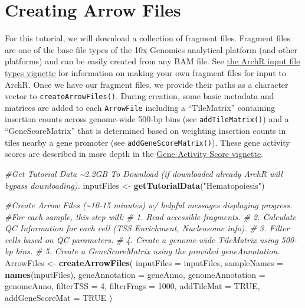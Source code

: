 \documentclass[
  12pt,
]{krantz}
\newenvironment{Shaded}{\begin{snugshade}}{\end{snugshade}}
\newcommand{\CommentTok}[1]{\textcolor[rgb]{0.56,0.35,0.01}{\textit{#1}}}
\newcommand{\DataTypeTok}[1]{\textcolor[rgb]{0.13,0.29,0.53}{#1}}
\newcommand{\DecValTok}[1]{\textcolor[rgb]{0.00,0.00,0.81}{#1}}
\newcommand{\KeywordTok}[1]{\textcolor[rgb]{0.13,0.29,0.53}{\textbf{#1}}}
\newcommand{\NormalTok}[1]{#1}
\newcommand{\OtherTok}[1]{\textcolor[rgb]{0.56,0.35,0.01}{#1}}
\newcommand{\StringTok}[1]{\textcolor[rgb]{0.31,0.60,0.02}{#1}}
\begin{document}
\hypertarget{creating-arrow-files}{%
\chapter{Creating Arrow Files}\label{creating-arrow-files}}

For this tutorial, we will download a collection of fragment files. Fragment files are one of the base file types of the 10x Genomics analytical platform (and other platforms) and can be easily created from any BAM file. See \href{articles/Articles/inputFiles.html}{the ArchR input file types vignette} for information on making your own fragment files for input to ArchR. Once we have our fragment files, we provide their paths as a character vector to \texttt{createArrowFiles()}. During creation, some basic metadata and matrices are added to each \texttt{ArrowFile} including a ``TileMatrix'' containing insertion counts across genome-wide 500-bp bins (see \texttt{addTileMatrix()}) and a ``GeneScoreMatrix'' that is determined based on weighting insertion counts in tiles nearby a gene promoter (see \texttt{addGeneScoreMatrix()}). These gene activity scores are described in more depth in the \href{articles/Articles/geneScores.html}{Gene Activity Score vignette}.

\begin{Shaded}
\begin{Highlighting}[]
\CommentTok{\#Get Tutorial Data \textasciitilde{}2.2GB To Download (if downloaded already ArchR will bypass downloading).}
\NormalTok{inputFiles <{-}}\StringTok{ }\KeywordTok{getTutorialData}\NormalTok{(}\StringTok{"Hematopoiesis"}\NormalTok{)}

\CommentTok{\#Create Arrow Files (\textasciitilde{}10{-}15 minutes) w/ helpful messages displaying progress.}
\CommentTok{\#For each sample, this step will:}
\CommentTok{\# 1. Read accessible fragments.}
\CommentTok{\# 2. Calculate QC Information for each cell (TSS Enrichment, Nucleosome info).}
\CommentTok{\# 3. Filter cells based on QC parameters.}
\CommentTok{\# 4. Create a genome{-}wide TileMatrix using 500{-}bp bins.}
\CommentTok{\# 5. Create a GeneScoreMatrix using the provided geneAnnotation.}
\NormalTok{ArrowFiles <{-}}\StringTok{ }\KeywordTok{createArrowFiles}\NormalTok{(}
  \DataTypeTok{inputFiles =}\NormalTok{ inputFiles,}
  \DataTypeTok{sampleNames =} \KeywordTok{names}\NormalTok{(inputFiles),}
  \DataTypeTok{geneAnnotation =}\NormalTok{ geneAnno,}
  \DataTypeTok{genomeAnnotation =}\NormalTok{ genomeAnno,}
  \DataTypeTok{filterTSS =} \DecValTok{4}\NormalTok{,}
  \DataTypeTok{filterFrags =} \DecValTok{1000}\NormalTok{,}
  \DataTypeTok{addTileMat =} \OtherTok{TRUE}\NormalTok{,}
  \DataTypeTok{addGeneScoreMat =} \OtherTok{TRUE}
\NormalTok{  )}
\end{Highlighting}
\end{Shaded}
\end{document}
